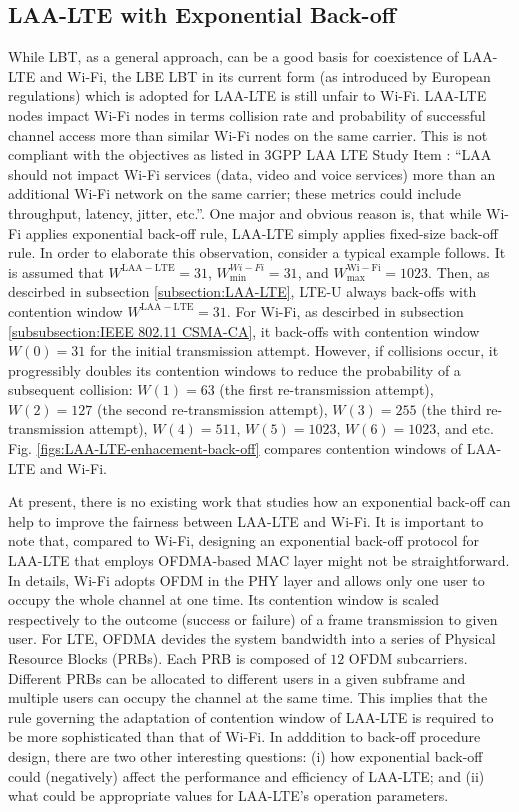 \documentclass[12pt,onecolumn]{article}
\begin{document}
\subsection{LAA-LTE with Exponential Back-off}
\label{subsection:exp-back-off}

While LBT, as a general approach, can be a good basis for coexistence of LAA-LTE and Wi-Fi, the LBE LBT in its current form (as introduced by European regulations) which is adopted for LAA-LTE is still unfair to Wi-Fi. LAA-LTE nodes impact Wi-Fi nodes in terms collision rate and probability of successful channel access more than similar Wi-Fi nodes on the same carrier. This is not compliant with the objectives as listed in 3GPP LAA LTE Study Item \cite{LAA-LTE-SI}: ``LAA should not impact Wi-Fi services (data, video and voice services) more than an additional Wi-Fi network on the same carrier; these metrics could include throughput, latency, jitter, etc.''. One major and obvious reason is, that while Wi-Fi applies exponential back-off rule, LAA-LTE simply applies fixed-size back-off rule. In order to elaborate this observation, consider a typical example follows. It is assumed that $W^{\mathrm{LAA-LTE}}=31$, $W^{Wi-Fi}_{\min}=31$, and $W^{\mathrm{Wi-Fi}}_{\max}=1023$. Then, as descirbed in subsection \ref{subsection:LAA-LTE}, LTE-U always back-offs with contention window $W^{\mathrm{LAA-LTE}}=31$. For Wi-Fi, as descirbed in subsection \ref{subsubsection:IEEE 802.11 CSMA-CA}, it back-offs with contention window $W(0)=31$ for the initial transmission attempt. However, if collisions occur, it progressibly doubles its contention windows to reduce the probability of a subsequent collision: $W(1)=63$ (the first re-transmission attempt), $W(2)=127$ (the second re-transmission attempt), $W(3)=255$ (the third re-transmission attempt), $W(4)=511$, $W(5)=1023$, $W(6)=1023$, and etc. Fig. \ref{figs:LAA-LTE-enhacement-back-off} compares contention windows of LAA-LTE and Wi-Fi.

At present, there is no existing work that studies how an exponential back-off can help to improve the fairness between LAA-LTE and Wi-Fi. It is important to note that, compared to Wi-Fi, designing an exponential back-off protocol for LAA-LTE that employs OFDMA-based MAC layer might not be straightforward. In details, Wi-Fi adopts OFDM in the PHY layer and allows only one user to occupy the whole channel at one time. Its contention window is scaled respectively to the outcome (success or failure) of a frame transmission to given user. For LTE, OFDMA devides the system bandwidth into a series of Physical Resource Blocks (PRBs). Each PRB is composed of $12$ OFDM subcarriers. Different PRBs can be allocated to different users in a given subframe and multiple users can occupy the channel at the same time. This implies that the rule governing the adaptation of contention window of LAA-LTE is required to be more sophisticated than that of Wi-Fi. In adddition to back-off procedure design, there are two other interesting questions: (i) how exponential back-off could (negatively) affect the performance and efficiency of LAA-LTE; and (ii) what could be appropriate values for LAA-LTE's operation parameters.
\end{document}
